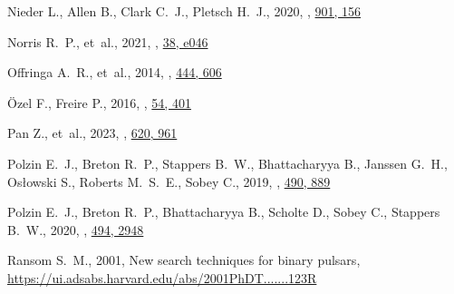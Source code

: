 \documentclass[fleqn,usenatbib]{mnras}
\begin{document}
\begin{thebibliography}{99}
{Nieder} L.,  {Allen} B.,  {Clark} C.~J.,   {Pletsch} H.~J.,  2020, , \href {https://ui.adsabs.harvard.edu/abs/2020ApJ...901..156N} {901, 156}

{Norris} R.~P.,  et~al., 2021, , \href {https://ui.adsabs.harvard.edu/abs/2021PASA...38...46N} {38, e046}

{Offringa} A.~R.,  et~al., 2014, , \href {https://ui.adsabs.harvard.edu/abs/2014MNRAS.444..606O} {444, 606}

{{\"O}zel} F.,  {Freire} P.,  2016, , \href {https://ui.adsabs.harvard.edu/abs/2016ARA&A..54..401O} {54, 401}

{Pan} Z.,  et~al., 2023, , \href {https://ui.adsabs.harvard.edu/abs/2023Natur.620..961P} {620, 961}

{Polzin} E.~J.,  {Breton} R.~P.,  {Stappers} B.~W.,  {Bhattacharyya} B.,  {Janssen} G.~H.,  {Os{\l}owski} S.,  {Roberts} M.~S.~E.,   {Sobey} C.,  2019, , \href {https://ui.adsabs.harvard.edu/abs/2019MNRAS.490..889P} {490, 889}

{Polzin} E.~J.,  {Breton} R.~P.,  {Bhattacharyya} B.,  {Scholte} D.,  {Sobey} C.,   {Stappers} B.~W.,  2020, , \href {https://ui.adsabs.harvard.edu/abs/2020MNRAS.494.2948P} {494, 2948}

Ransom S.~M.,  2001, {New search techniques for binary pulsars}, \url {https://ui.adsabs.harvard.edu/abs/2001PhDT.......123R}


\end{thebibliography}
\end{document}
